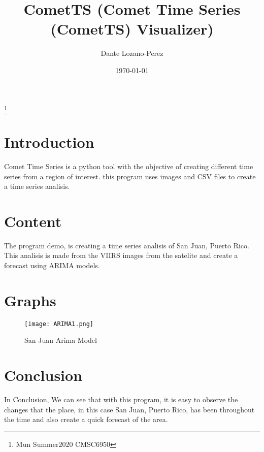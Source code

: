 \documentclass[12pt]{article}
\begin{document}
\title{CometTS (Comet Time Series (CometTS) Visualizer)} 
\author{Dante Lozano-Perez}\thanks{Mun Summer2020 CMSC6950}
\date{\today}

\maketitle

\section{Introduction}
Comet Time Series is a python tool with the objective of creating different time series from a region of interest. this program uses images and CSV files to create a time series analisis.


\section{Content}

The program demo, is creating a time series analisis of San Juan, Puerto Rico. This analisis is made from the VIIRS images from the satelite and create a forecast using ARIMA models.


\section{Graphs}

    \begin{figure}[h!]
        \centering
        \texttt{[image: ARIMA1.png]}
        \caption{San Juan Arima Model}
        \label{fig:ARIMA1}
        \end{figure}



\section{Conclusion}
In Conclusion, We can see that with this program, it is easy to observe the changes that the place, in this case San Juan, Puerto Rico, has been throughout the time and also create a quick forecast of the area.
\end{document}
